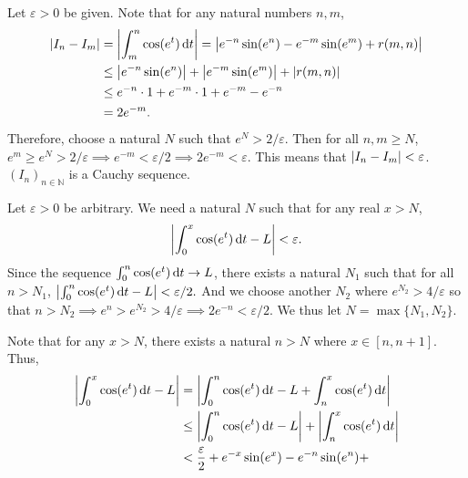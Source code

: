 \documentclass[12pt]{article}
\begin{document}
\begin{fproof}[1(b)]
    Let \(\varepsilon>0\) be given.
    Note that for any natural numbers \(n,m\),
    \begin{align*}
        \left\lvert I_n - I_m \right\rvert &= \left\lvert \int_{m}^{n} \cos(e^t) \mathop{}\!\mathrm{d} t \right\rvert = \left\lvert e^{-n}\sin(e^n) - e^{-m}\sin(e^m) + r(m,n) \right\rvert\\
        & \leq \left\lvert e^{-n}\sin(e^n) \right\rvert + \left\lvert e^{-m}\sin(e^m) \right\rvert + \left\lvert r(m,n) \right\rvert\\
        & \leq e^{-n} \cdot 1 + e^{-m} \cdot 1 + e^{-m} - e^{-n}\\
        & =2e^{-m}.
    \end{align*}
    Therefore, choose a natural \(N\) such that \(e^{N} > 2/\varepsilon\).
    Then for all \(n,m \geq N\),
    \(e^{m} \geq e^{N} > 2/\varepsilon \implies e^{-m} < \varepsilon/2 \implies 2e^{-m} < \varepsilon \).
    This means that \(\left\lvert I_n - I_m \right\rvert < \varepsilon\).
    \((I_n)_{n \in \mathbb{N}}\) is a Cauchy sequence.
\end{fproof}

\begin{fproof}[1(c)]
Let \(\varepsilon > 0\) be arbitrary.
We need a natural \(N\) such that for any real \(x > N\),
\begin{align*}
    \left\lvert \int_{0}^{x} \cos(e^t) \mathop{}\!\mathrm{d} t - L \right\rvert < \varepsilon.
\end{align*}
Since the sequence \(\int_{0}^{n} \cos(e^t) \mathop{}\!\mathrm{d} t \to L\), there exists a natural \(N_1\) such that for all \(n > N_1\), \(\left\lvert \int_{0}^{n} \cos(e^t) \mathop{}\!\mathrm{d} t - L \right\rvert < \varepsilon/2.\)
And we choose another \(N_2\) where \(e^{N_2} > 4/\varepsilon\) so that \(n > N_2 \implies e^n > e^{N_2} > 4/\varepsilon \implies 2e^{-n} < \varepsilon/2\).
We thus let \(N = \max\{N_1, N_2\}\).

Note that for any \(x > N\), there exists a natural \(n > N\) where \(x \in [n, n+1]\).
Thus,
\begin{align*}
    \left\lvert \int_{0}^{x} \cos(e^t) \mathop{}\!\mathrm{d} t - L \right\rvert &= \left\lvert \int_{0}^{n} \cos(e^t) \mathop{}\!\mathrm{d} t - L + \int_{n}^{x} \cos(e^t) \mathop{}\!\mathrm{d} t \right\rvert\\
    &\leq \left\lvert \int_{0}^{n} \cos(e^t) \mathop{}\!\mathrm{d} t - L \right\rvert + \left\lvert \int_{n}^{x} \cos(e^t) \mathop{}\!\mathrm{d} t \right\rvert\\
    & < \frac{\varepsilon}{2} + e^{-x}\sin(e^x) - e^{-n}\sin(e^n) + 
\end{align*}
\end{fproof}
\newpage

\begin{fproof}[2(a)]

\end{fproof}

\begin{fproof}[2(b)]

\end{fproof}

\begin{fproof}[2(c)]

\end{fproof}

\begin{fproof}[2(d)]

\end{fproof}

\begin{fproof}[2(e)]

\end{fproof}
\end{document}
